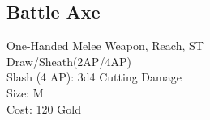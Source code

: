 \subsection{Battle Axe}\label{weapon:battleAxe}
One-Handed Melee Weapon,  Reach, ST\\
Draw/Sheath(2AP/4AP)\\
Slash (4 AP): 3d4 Cutting Damage\\
Size: M\\
Cost: 120 Gold\\